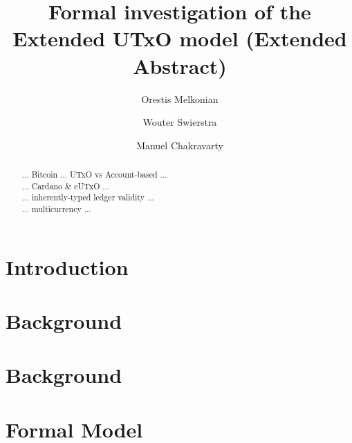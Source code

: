 \documentclass[sigplan,nonacm=true,screen=true]{acmart}
\begin{document}
\sloppy %

\title{Formal investigation of the Extended UTxO model (Extended Abstract)}

\author{Orestis Melkonian}

\author{Wouter Swierstra}

\author{Manuel Chakravarty}

\begin{abstract}
... Bitcoin ... UTxO vs Account-based ...\\
... Cardano \& eUTxO ...\\
... inherently-typed ledger validity ...\\
... multicurrency ...\\
\end{abstract}

\maketitle

\section{Introduction}
\label{sec:intro}

\section{Background}
\label{sec:background}

\section{Background}
\label{sec:background}

\section{Formal Model}
\label{sec:model}

\nocite{*}

\end{document}
